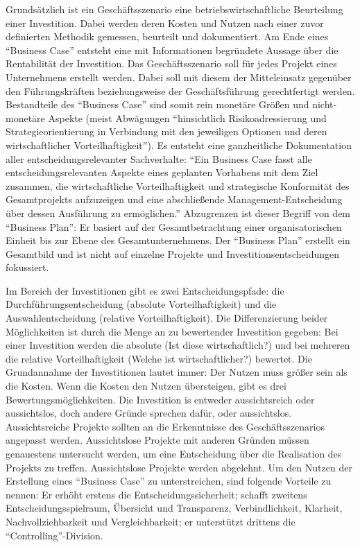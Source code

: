 Grundsätzlich ist ein Geschäftsszenario eine betriebswirtschaftliche Beurteilung einer Investition. Dabei werden deren Kosten und Nutzen nach einer zuvor definierten Methodik gemessen, beurteilt und dokumentiert. Am Ende eines \enquote{Business Case} entsteht eine mit Informationen begründete Aussage über die Rentabilität der Investition. Das Geschäftsszenario soll für jedes Projekt eines Unternehmens erstellt werden. Dabei soll mit diesem der Mitteleinsatz gegenüber den Führungskräften beziehungsweise der Geschäftsführung gerechtfertigt werden. Bestandteile des \enquote{Business Case} sind somit rein monetäre Größen und nicht-monetäre Aspekte (meist Abwägungen \enquote{hinsichtlich Risikoadressierung und Strategieorientierung in Verbindung mit den jeweiligen Optionen und deren wirtschaftlicher Vorteilhaftigkeit}\autocite[][S.\,12]{brugger_it_2009}). Es entsteht eine ganzheitliche Dokumentation aller entscheidungsrelevanter Sachverhalte: \enquote{Ein Business Case fasst alle entscheidungsrelevanten Aspekte eines geplanten Vorhabens mit dem Ziel zusammen, die wirtschaftliche Vorteilhaftigkeit und strategische Konformität des Gesamtprojekts aufzuzeigen und eine abschließende Management-Entscheidung über dessen Ausführung zu ermöglichen.}\autocite[][S.\,13]{brugger_it_2009} Abzugrenzen ist dieser Begriff von dem \enquote{Business Plan}: Er basiert auf der Gesamtbetrachtung einer organisatorischen Einheit bis zur Ebene des Gesamtunternehmens. Der \enquote{Business Plan} erstellt ein Gesamtbild und ist nicht auf einzelne Projekte und Investitionsentscheidungen fokussiert. 
\par
Im Bereich der Investitionen gibt es zwei Entscheidungspfade: die Durchführungsentscheidung (absolute Vorteilhaftigkeit) und die Auswahlentscheidung (relative Vorteilhaftigkeit).\autocite[vgl.][S.\,14]{brugger_it_2009} Die Differenzierung beider Möglichkeiten ist durch die Menge an zu bewertender Investition gegeben: Bei einer Investition werden die absolute (Ist diese wirtschaftlich?) und bei mehreren die relative Vorteilhaftigkeit (Welche ist wirtschaftlicher?) bewertet. Die Grundannahme der Investitionen lautet immer: Der Nutzen muss größer sein als die Kosten. Wenn die Kosten den Nutzen übersteigen, gibt es drei Bewertungsmöglichkeiten. Die Investition is entweder aussichtsreich oder aussichtslos, doch andere Gründe sprechen dafür, oder aussichtslos. Aussichtsreiche Projekte sollten an die Erkenntnisse des Geschäftsszenarios angepasst werden. Aussichtslose Projekte mit anderen Gründen müssen genauestens untersucht werden, um eine Entscheidung über die Realisation des Projekts zu treffen. Aussichtslose Projekte werden abgelehnt. Um den Nutzen der Erstellung eines \enquote{Business Case} zu unterstreichen, sind folgende Vorteile zu nennen: Er erhöht erstens die Entscheidungssicherheit; schafft zweitens Entscheidungsspielraum, Übersicht und Transparenz, Verbindlichkeit, Klarheit, Nachvollziehbarkeit und Vergleichbarkeit; er unterstützt drittens die \enquote{Controlling}-Division.\autocite[vgl.][S.\,17]{brugger_it_2009} \par
